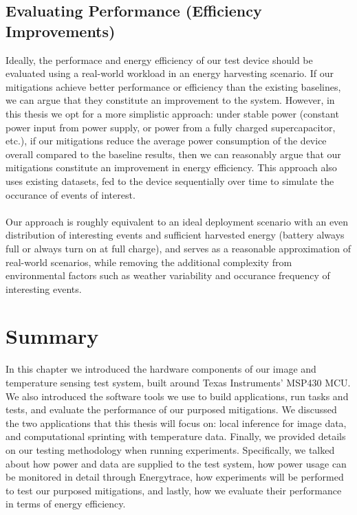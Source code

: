\documentclass[twoside]{report}
\begin{document}
\subsection{Evaluating Performance (Efficiency Improvements)}
Ideally, the performace and energy efficiency of our test device should be evaluated using a real-world workload
in an energy harvesting scenario. If our mitigations achieve better performance or efficiency than the existing 
baselines, we can argue that they constitute an improvement to the system. However, in this thesis we opt 
for a more simplistic approach: under stable power (constant power input from power supply, or power from a fully 
charged supercapacitor, etc.), if our mitigations reduce the average power consumption of the device overall 
compared to the baseline results, then we can reasonably argue that our mitigations constitute an improvement in 
energy efficiency. This approach also uses existing datasets, fed to the device sequentially over time to simulate the occurance of 
events of interest.\\\\
Our approach is roughly equivalent to an ideal deployment scenario with an even distribution of interesting events and sufficient 
harvested energy (battery always full or always turn on at full charge), and serves as a reasonable approximation of real-world scenarios, while removing the additional 
complexity from environmental factors such as weather variability and occurance frequency of interesting events.

\section{Summary}
In this chapter we introduced the hardware components of our image and temperature sensing test system, built around Texas Instruments' MSP430 MCU.
We also introduced the software tools we use to build applications, run tasks and tests, and evaluate the performance of our purposed mitigations. 
We discussed the two applications that this thesis will focus on: local inference for image data, and computational sprinting with 
temperature data.
Finally, we provided details on our testing methodology when running experiments. Specifically, we talked about 
how power and data are supplied to the test system, how power usage can be monitored in detail through Energytrace, 
how experiments will be performed to test our purposed mitigations, and lastly, how we evaluate their performance 
in terms of energy efficiency.
\end{document}
